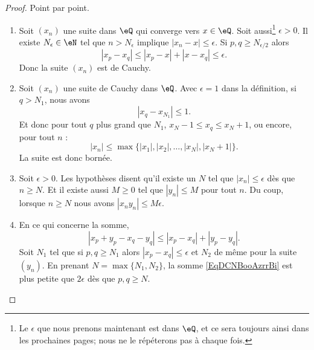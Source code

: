 \begin{proof}
    Point par point.
    \begin{enumerate}
        \item
            Soit \( (x_n)\) une suite dans \( \eQ\) qui converge vers \( x\in \eQ\). Soit aussi\footnote{Le \( \epsilon\) que nous prenons maintenant est dans \( \eQ\), et ce sera toujours ainsi dans les prochaines pages; nous ne le répéterons pas à chaque fois.} \( \epsilon>0\). Il existe \( N_{\epsilon}\in \eN\) tel que \( n>N_{\epsilon}\) implique \( | x_n-x |\leq \epsilon\). Si \( p,q\geq N_{\epsilon/2}\) alors
            \begin{equation}
                | x_p-x_q |\leq | x_p-x |+| x-x_q |\leq \epsilon.
            \end{equation}
            Donc la suite \( (x_n)\) est de Cauchy.
        \item
            Soit \( (x_n)\) une suite de Cauchy dans \( \eQ\). Avec \( \epsilon=1\) dans la définition, si \( q>N_1\), nous avons
            \begin{equation}
                | x_q-x_{N_1} |\leq 1.
            \end{equation}
            Et donc pour tout \( q\) plus grand que \( N_1\), \( x_N-1\leq x_q\leq x_N+1\), ou encore, pour tout \( n\) :
            \begin{equation}
                | x_n |\leq\max\{ | x_1 |,| x_2 |,\ldots,| x_N |,| x_N+1 | \}.
            \end{equation}
            La suite est donc bornée.
        \item
            Soit \(\epsilon>0\). Les hypothèses disent qu'il existe un \( N\) tel que \( | x_n |\leq \epsilon\) dès que \( n\geq N\). Et il existe aussi \( M\geq 0\) tel que \( | y_n |\leq M\) pour tout \( n\). Du coup, lorsque \( n\geq N\) nous avons \( | x_ny_n |\leq M\epsilon\).
        \item
            En ce qui concerne la somme,
            \begin{equation}        \label{EqDCNBooAzrrBi}
                | x_p+y_p-x_q-y_q |\leq | x_p-x_q |+| y_p-y_q |.
            \end{equation}
            Soit \( N_1\) tel que si \( p,q\geq N_1\) alors \( | x_p-x_q |\leq \epsilon\) et \( N_2\) de même pour la suite \( (y_n)\). En prenant \( N=\max\{ N_1,N_2 \}\), la somme \eqref{EqDCNBooAzrrBi} est plus petite que \( 2\epsilon\) dès que \( p,q\geq N\).


\end{enumerate}
\end{proof}
